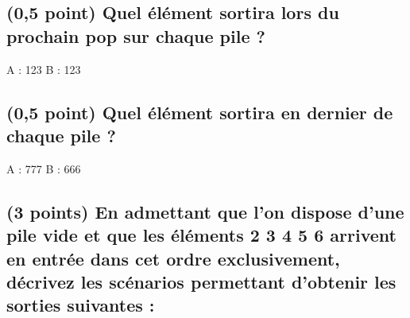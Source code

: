 \documentclass[11pt,a4paper]{article}
\begin{document}
\bigskip


\subsection{(0,5 point) Quel élément sortira lors du prochain \og pop \fg{} sur chaque pile ? }

\bigskip
\bigskip

\begin{Large}
A : 123 \hspace{7.5cm}  B : 123
\end{Large}

\bigskip
\bigskip


\subsection{(0,5 point) Quel élément sortira en dernier de chaque pile ? }

\bigskip
\bigskip

\begin{Large}
A : 777 \hspace{7.5cm}  B : 666
\end{Large}

\bigskip
\bigskip



\hspace{0pt}
\vfill

\newpage

\subsection{(3 points) En admettant que l'on dispose d'une pile vide et que les éléments  2 3 4 5 6 \fg{} arrivent en entrée dans cet ordre exclusivement, décrivez les scénarios permettant d'obtenir les sorties suivantes : }
%
%
\end{document}
